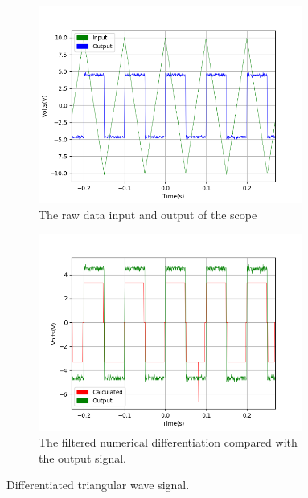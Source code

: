 \begin{figure}[h!]
\centering
\begin{subfigure}[t]{.475\textwidth}
  \centering
  \includegraphics[width=0.95\textwidth, height=0.20\textheight]{figures/Differentiation/scope_15raw.png}
  \caption{The raw data input and output of the scope}
 \label{fig:diff_triangular_raw}
\end{subfigure}\hfill
\begin{subfigure}[t]{.475\textwidth}
  \centering
  \includegraphics[width=0.95\textwidth, height=0.20\textheight]{figures/Differentiation/scope_15_calc_behind.png}
  \caption{The filtered numerical differentiation compared with the output signal.}
\label{fig:diff_triangular_filter}
\end{subfigure}
\caption{Differentiated triangular wave signal.}
\label{fig:diff_triangular}
\end{figure}

